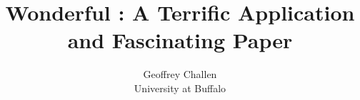 


\date{}

\title{\Large \bf Wonderful : A Terrific Application and Fascinating Paper}

\author{
{\rm Geoffrey Challen}\\
University at Buffalo
} %

\maketitle




{\footnotesize


}


